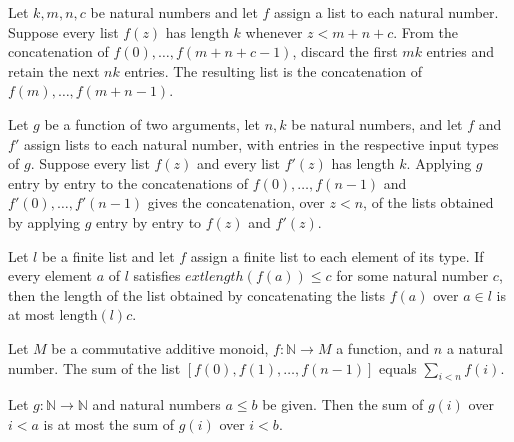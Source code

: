 \begin{theorem}
\label{List.take_drop_flatMap_range}
\leanok
{}
Let $k,m,n,c$ be natural numbers and let $f$ assign a list to each natural number.
Suppose every list $f(z)$ has length $k$ whenever $z<m+n+c$. From the concatenation of
$f(0),\ldots,f(m+n+c-1)$, discard the first $mk$ entries and retain the next $nk$
entries. The resulting list is the concatenation of $f(m),\ldots,f(m+n-1)$.
\end{theorem}

\begin{theorem}
\label{List.zipWith_flatMap_range}
\leanok
{}
Let $g$ be a function of two arguments, let $n,k$ be natural numbers, and let $f$ and
$f'$ assign lists to each natural number, with entries in the respective input types of
$g$. Suppose every list $f(z)$ and every list $f'(z)$ has length $k$. Applying $g$ entry
by entry to the concatenations of $f(0),\ldots,f(n-1)$ and $f'(0),\ldots,f'(n-1)$ gives
the concatenation, over $z<n$, of the lists obtained by applying $g$ entry by entry to
$f(z)$ and $f'(z)$.
\end{theorem}

\begin{theorem}
\label{List.length_flatMap_le}
\leanok
{}
Let $l$ be a finite list and let $f$ assign a finite list to each element of its type.
If every element $a$ of $l$ satisfies $	ext{length}(f(a))\le c$ for some natural number
$c$, then the length of the list obtained by concatenating the lists $f(a)$ over $a\in
l$ is at most $\text{length}(l)c$.
\end{theorem}

\begin{theorem}
\label{List.sum_map_range}
\leanok
{}
Let $M$ be a commutative additive monoid, $f:\mathbb{N}\to M$ a function, and $n$ a
natural number. The sum of the list $[f(0),f(1),\ldots,f(n-1)]$ equals $\sum_{i<n}f(i)$.
\end{theorem}

\begin{theorem}
\label{List.sum_map_range_mono}
\leanok
{}
Let $g:\mathbb{N}\to\mathbb{N}$ and natural numbers $a\le b$ be given. Then the sum of
$g(i)$ over $i<a$ is at most the sum of $g(i)$ over $i<b$.
\end{theorem}

